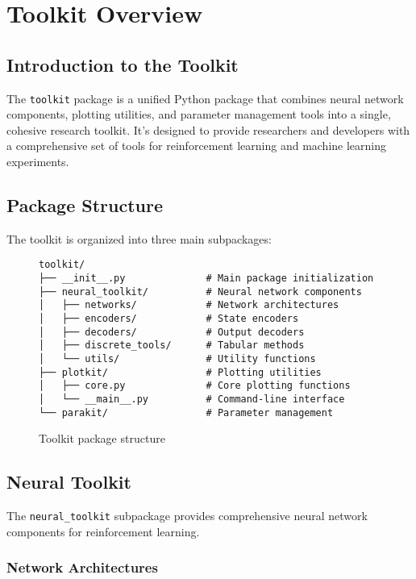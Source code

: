 \chapter{Toolkit Overview}

\section{Introduction to the Toolkit}

The \texttt{toolkit} package is a unified Python package that combines neural network components, plotting utilities, and parameter management tools into a single, cohesive research toolkit. It's designed to provide researchers and developers with a comprehensive set of tools for reinforcement learning and machine learning experiments.

\section{Package Structure}

The toolkit is organized into three main subpackages:

\begin{figure}[H]
\centering
\begin{verbatim}
toolkit/
├── __init__.py              # Main package initialization
├── neural_toolkit/          # Neural network components
│   ├── networks/            # Network architectures
│   ├── encoders/            # State encoders
│   ├── decoders/            # Output decoders
│   ├── discrete_tools/      # Tabular methods
│   └── utils/               # Utility functions
├── plotkit/                 # Plotting utilities
│   ├── core.py              # Core plotting functions
│   └── __main__.py          # Command-line interface
└── parakit/                 # Parameter management
\end{verbatim}
\caption{Toolkit package structure}
\end{figure}

\section{Neural Toolkit}

The \texttt{neural\_toolkit} subpackage provides comprehensive neural network components for reinforcement learning.

\subsection{Network Architectures}

